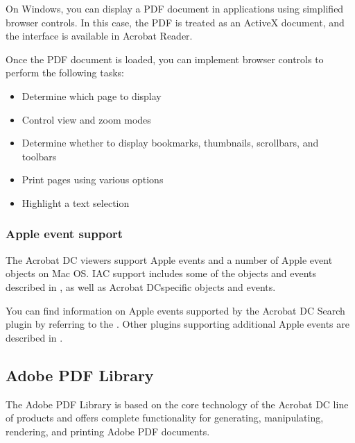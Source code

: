 \documentclass[letterpaper,12pt,english,openany,oneside]{sphinxmanual}
\begin{document}
On Windows, you can display a PDF document in applications using simplified browser controls. In this case, the PDF is treated as an ActiveX document, and the interface is available in Acrobat Reader.

Once the PDF document is loaded, you can implement browser controls to perform the following tasks:
\begin{itemize}
\item {} 
Determine which page to display

\item {} 
Control view and zoom modes

\item {} 
Determine whether to display bookmarks, thumbnails, scrollbars, and toolbars

\item {} 
Print pages using various options

\item {} 
Highlight a text selection

\end{itemize}


\subsubsection{Apple event support}
\label{\detokenize{index:apple-event-support}}
The Acrobat DC viewers support Apple events and a number of Apple event objects on Mac OS. IAC support includes some of the objects and events described in  , as well as Acrobat DC\sphinxhyphen{}specific objects and events.

You can find information on Apple events supported by the Acrobat DC Search plug\sphinxhyphen{}in by referring to the  . Other plug\sphinxhyphen{}ins supporting additional Apple events are described in  .




\subsection{Adobe PDF Library}
\label{\detokenize{index:adobe-pdf-library}}
The Adobe PDF Library is based on the core technology of the Acrobat DC line of products and offers complete functionality for generating, manipulating, rendering, and printing Adobe PDF documents.
\end{document}
